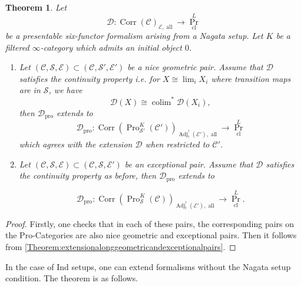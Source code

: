 \documentclass[14pt]{article}
\newtheorem{theorem}{Theorem}[subsection]
\theoremstyle{definition}
\newcommand{\E}{\mathcal{E}}
\newcommand{\D}{\mathcal{D}}
\newcommand{\op}[1]{\operatorname{#1}}
\renewcommand{\S}{\mathcal{S}}
\newcommand{\Ca}{\mathcal{C}}
\numberwithin{subsection}{section}
\begin{document}
\begin{theorem}\label{theorem:proextensiongeoandeceptionalpairs}
Let 
   \begin{equation}
       \D: \op{Corr}(\Ca)_{\E,\op{all}} \to \op{Pr}^L_{\op{cl}}
   \end{equation}
   be a presentable six-functor formalism  arising from a Nagata setup. Let $K$ be a filtered $\infty$-category which admits an initial object $0$.
   \begin{enumerate}
   \item Let $(\Ca,\S,\E) \subset (\Ca,\S',\E')$ be a nice geometric pair. Assume that $\D$ satisfies the \textit{continuity property} i.e. for $X \cong \op{lim}_i X_i$ where transition maps are in $\S$, we have 
   \begin{equation}
       \D(X) \cong \op{colim}^* \D(X_i),
   \end{equation}then $\D_{\op{pro}}$ extends to 
   \begin{equation}
       \D_{\op{pro}} : \op{Corr}(\op{Pro}^K_{\S'}(\Ca'))_{\op{Adj}^!_!(\E'),\op{all}} \to \op{Pr}^L_{\op{cl}}
   \end{equation}
   which agrees with the extension $\D$ when restricted to $\Ca'$.
   \item Let $(\Ca,\S,\E) \subset (\Ca,\S,\E')$ be an exceptional pair. Assume that $\D$ satisfies the continuity property as before, then $\D_{\op{pro}}$ extends to

    \begin{equation}
       \D_{\op{pro}} : \op{Corr}(\op{Pro}^K_{\S}(\Ca))_{\op{Adj}^!_!(\E'),\op{all}} \to \op{Pr}^L_{\op{cl}}.
   \end{equation}


   \end{enumerate}
    
    
\end{theorem}

\begin{proof}
    Firstly, one checks that in each of these pairs, the corresponding pairs on the Pro-Categories are also nice geometric and exceptional pairs. Then it follows from \cref{Theorem:extensionalonggeometricandexceptionalpairs}.
\end{proof}


In the case of Ind setups, one can extend formalisms without the Nagata setup condition. The theorem is as follows.
\end{document}
